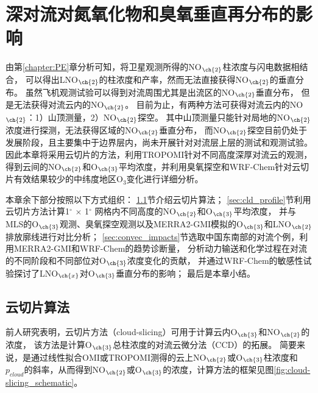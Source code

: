 
\chapter{深对流对氮氧化物和臭氧垂直再分布的影响}

由第\ref{chapter:PE}章分析可知，将卫星观测所得的NO$_{\ch{2}}$柱浓度与闪电数据相结合，
可以得出LNO$_{\ch{2}}$的柱浓度和产率，然而无法直接获得NO$_{\ch{2}}$的垂直分布。
虽然飞机观测试验可以得到对流周围尤其是出流区的NO$_{\ch{2}}$垂直分布\citep{Barth.2019}，
但是无法获得对流云内的NO$_{\ch{2}}$。
目前为止，有两种方法可获得对流云内的NO$_{\ch{2}}$：1）山顶测量，2）NO$_{\ch{2}}$探空。
其中山顶测量只能针对局地的NO$_{\ch{2}}$浓度进行探测，无法获得区域的NO$_{\ch{2}}$垂直分布\citep{Reiter.1970,Wang.2021a}，
而NO$_{\ch{2}}$探空目前仍处于发展阶段，且主要集中于边界层内\citep{Sluis.2010}，尚未开展针对对流层上层的测试和观测试验。
因此本章将采用云切片的方法，利用TROPOMI针对不同高度深厚对流云的观测，得到云间的NO$_{\ch{2}}$和O$_{\ch{3}}$平均浓度，并利用臭氧探空和WRF-Chem针对云切片有效结果较少的中纬度地区O$_3$变化进行详细分析。

本章余下部分按照以下方式组织：
\ref{sec:cloud-slicing}节介绍云切片算法；
\ref{sec:cld_profile}节利用云切片方法计算1$^{\circ}$ $\times$ 1$^{\circ}$ 网格内不同高度的NO$_{\ch{2}}$和O$_{\ch{3}}$平均浓度，
并与MLS的O$_{\ch{3}}$观测、臭氧探空观测以及MERRA2-GMI模拟的O$_{\ch{3}}$和LNO$_{\ch{2}}$排放廓线进行对比分析；
\ref{sec:convec_impacts}节选取中国东南部的对流个例，利用MERRA2-GMI和WRF-Chem的趋势诊断量，
分析动力输送和化学过程在对流的不同阶段和不同部位对O$_{\ch{3}}$浓度变化的贡献，
并通过WRF-Chem的敏感性试验探讨了LNO$_{\ch{x}}$对O$_{\ch{3}}$垂直分布的影响；
最后是本章小结。


\section{云切片算法} \label{sec:cloud-slicing}

前人研究表明，云切片方法（cloud-slicing）可用于计算云内O$_{\ch{3}}$和NO$_{\ch{2}}$的浓度，
该方法是计算O$_{\ch{3}}$总柱浓度的对流云微分法（CCD）的拓展\citep{Ziemke.1998,Ziemke.2001}。
简要来说，是通过线性拟合OMI或TROPOMI测得的云上NO$_{\ch{2}}$或O$_{\ch{3}}$柱浓度和$p_{cloud}$的斜率，从而得到NO$_{\ch{2}}$或O$_{\ch{3}}$的浓度，计算方法的框架见图\ref{fig:cloud-slicing_schematic}。

